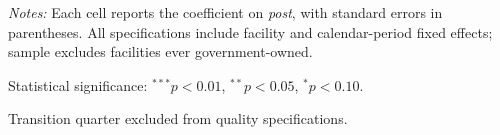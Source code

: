 \begin{table}[!ht]
\begin{threeparttable}
\begin{tablenotes}[flushleft]
\footnotesize
\item \textit{Notes:} Each cell reports the coefficient on \textit{post}, with standard errors in parentheses. All specifications include facility and calendar-period fixed effects; sample excludes facilities ever government-owned.
\item Statistical significance: $^{***}p<0.01$, $^{**}p<0.05$, $^{*}p<0.10$.
\item Transition quarter excluded from quality specifications.
\end{tablenotes}
\end{threeparttable}
\end{table}


